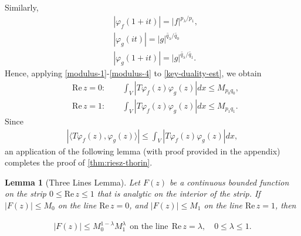 \documentclass[12pt,reqno]{amsart}
\numberwithin{equation}{section}  %
\numberwithin{figure}{section}
\newcommand{\vp}{\varphi}
\theoremstyle{plain}
\newtheorem{lemma}{Lemma}
\theoremstyle{definition}
\theoremstyle{remark}
\begin{document}
%
%
Similarly,
%
%
\begin{align}
	\label{modulus-2}
	& | \vp_f(1 + it) | = | f |^{p_\lambda / p_1},
	\\
	\label{modulus-3}
	& | \vp_{g}(it) | = | g |^{\tilde{q_\lambda} / \tilde{q_0}}
	\\
	\label{modulus-4}
	& | \vp_{g}(1 + it) | = | g |^{\tilde{q_\lambda} / \tilde{q_1}}.
\end{align}
%
%
Hence, applying \eqref{modulus-1}-\eqref{modulus-4} to \eqref{key-duality-est},
we obtain
%
%
\begin{equation}
\label{bound-for-apply-3-line-lem}
\begin{split}
	& \text{Re}\,z = 0: \qquad \int_{V} | T \vp_{f}(z) \vp_{g}(z) | dx \le M_{p_0
	q_0},
	\\
	& \text{Re}\,z =1: \qquad \int_{V} | T \vp_{f}(z) \vp_{g}(z) | dx \le M_{p_1
	q_1}.
\end{split}
\end{equation}
%
%
Since
%
%
\begin{equation*}
\begin{split}
	|\langle T\vp_{f}(z), \vp_{g}(z) \rangle | \le \int_{V} | T \vp_{f}(z)
	\vp_{g}(z) | dx,
\end{split}
\end{equation*}
%
%
an application of the following lemma (with proof provided in the appendix)
completes the proof of \autoref{thm:riesz-thorin}. \qquad \qedsymbol
%
%
%
%
%
%
\begin{lemma}[Three Lines Lemma]
\label{lem:three-lines}
Let $F(z)$ be a continuous bounded function on the strip $0 \le \text{Re} \, z \le
1$ that is analytic on the interior of the strip. If $| F(z) | \le M_0$ on the
line $\text{Re}\, z=0$, and $| F(z) | \le M_1$ on the line $\text{Re}\, z=1$, then
\end{lemma}
%
%
%
%
\begin{equation}
\label{three-lines}
\begin{split}
	| F(z) | \le M_{0}^{1-\lambda} M_{1}^{\lambda} \ \ \text{on the line} \ \
	\text{Re}\,z=\lambda, \quad 0 \le \lambda \le 1.
\end{split}
\end{equation}
%
%
%
\appendix
\end{document}
